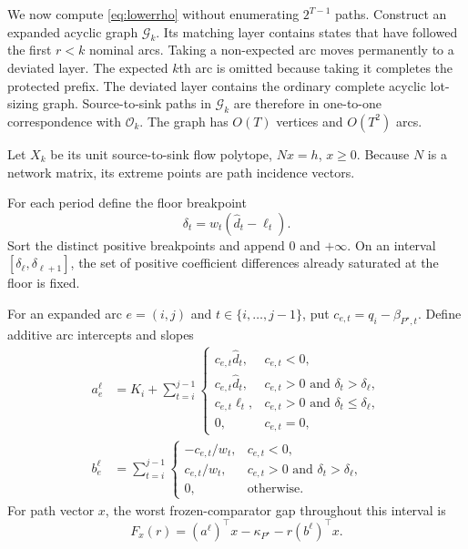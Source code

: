\documentclass[11pt]{article}
\theoremstyle{definition}
\newcommand{\cO}{\mathcal{O}}
\newcommand{\cG}{\mathcal{G}}
\newcommand{\dhat}{\widehat d}
\newcommand{\ellv}{\ell}
\begin{document}
We now compute \eqref{eq:lowerrho} without enumerating $2^{T-1}$ paths. Construct an expanded acyclic graph $\cG_k$. Its matching layer contains states that have followed the first $r<k$ nominal arcs. Taking a non-expected arc moves permanently to a deviated layer. The expected $k$th arc is omitted because taking it completes the protected prefix. The deviated layer contains the ordinary complete acyclic lot-sizing graph. Source-to-sink paths in $\cG_k$ are therefore in one-to-one correspondence with $\cO_k$. The graph has $O(T)$ vertices and $O(T^2)$ arcs.

Let $X_k$ be its unit source-to-sink flow polytope, $Nx=h$, $x\ge0$. Because $N$ is a network matrix, its extreme points are path incidence vectors.

For each period define the floor breakpoint
\begin{equation}\label{eq:breakpoints}
\delta_t=w_t(\dhat_t-\ellv_t).
\end{equation}
Sort the distinct positive breakpoints and append 0 and $+\infty$. On an interval $[\delta_\ell,\delta_{\ell+1}]$, the set of positive coefficient differences already saturated at the floor is fixed.

For an expanded arc $e=(i,j)$ and $t\in\{i,\ldots,j-1\}$, put $c_{e,t}=q_i-\beta_{P^\star,t}$. Define additive arc intercepts and slopes
\begin{align}
 a_e^\ell
 &=K_i+\sum_{t=i}^{j-1}
 \begin{cases}
 c_{e,t}\dhat_t,&c_{e,t}<0,\\
 c_{e,t}\dhat_t,&c_{e,t}>0\text{ and }\delta_t>\delta_\ell,\\
 c_{e,t}\ellv_t,&c_{e,t}>0\text{ and }\delta_t\le\delta_\ell,\\
 0,&c_{e,t}=0,
 \end{cases} \label{eq:aintercept}\\
 b_e^\ell
 &=\sum_{t=i}^{j-1}
 \begin{cases}
 -c_{e,t}/w_t,&c_{e,t}<0,\\
 c_{e,t}/w_t,&c_{e,t}>0\text{ and }\delta_t>\delta_\ell,\\
 0,&\text{otherwise}.
 \end{cases}\label{eq:bslope}
\end{align}
For path vector $x$, the worst frozen-comparator gap throughout this interval is
\begin{equation}\label{eq:intervalgap}
F_x(r)=(a^\ell)^\top x-\kappa_{P^\star}-r(b^\ell)^\top x.
\end{equation}
\end{document}
